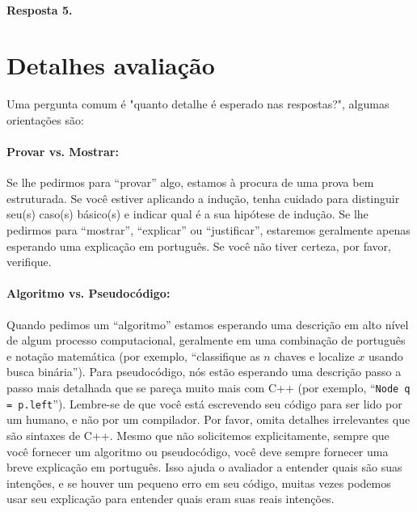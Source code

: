\documentclass{article}
\begin{document}
\paragraph{Resposta 5.}

\section{Detalhes avaliação}
Uma pergunta comum é "quanto detalhe é esperado nas respostas?", algumas orientações são:
%
\paragraph{Provar vs. Mostrar:}
Se lhe pedirmos para “provar” algo, estamos à procura de uma prova bem estruturada. Se você estiver aplicando a indução, tenha cuidado para distinguir seu(s) caso(s) básico(s) e indicar qual é a sua hipótese de indução. Se lhe pedirmos para “mostrar”, “explicar” ou “justificar”, estaremos geralmente apenas esperando uma explicação em português. Se você não tiver certeza, por favor, verifique.

\paragraph{Algoritmo vs. Pseudocódigo:} Quando pedimos um “algoritmo” estamos esperando uma descrição em alto nível de algum processo computacional, geralmente em uma combinação de português e notação matemática (por exemplo, “classifique as $n$ chaves e localize $x$ usando busca binária”). Para pseudocódigo, nós estão esperando uma descrição passo a passo mais detalhada que se pareça muito mais com C++ (por exemplo, “\texttt{Node q = p.left}”). Lembre-se de que você está escrevendo seu código para ser lido por um humano, e não por um compilador. Por favor, omita detalhes irrelevantes que são sintaxes de C++. Mesmo que não solicitemos explicitamente, sempre que você fornecer um algoritmo ou pseudocódigo, você deve sempre fornecer uma breve explicação em português. Isso ajuda o avaliador a entender quais são suas intenções, e se houver um pequeno erro em seu código, muitas vezes podemos usar seu explicação para entender quais eram suas reais intenções.
\end{document}

